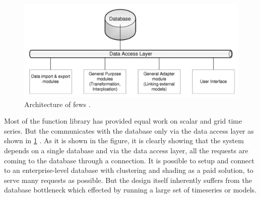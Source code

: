 \begin{figure}[htp]
    \centering
    \includegraphics[width=1.0\textwidth]{lit/fews/Architecture-of-Delft-FEWS-showing-the-data-base-the-data-access-layers-and-examples-of_W640.png}
    \caption[Architecture of \acrshort{fews}]{Architecture of \acrshort{fews} \cite{Werner2013TheSystem}.}
    \label{fi:fews_data_layer}
\end{figure}
Most of the function library has provided equal work on scalar and grid time series. But the communicates with the database only via the data access layer as shown in \cref{fi:fews_data_layer} \cite{Werner2013TheSystem}. As it is shown in the figure, it is clearly showing that the system depends on a single database and via the data access layer, all the requests are coming to the database through a connection. It is possible to setup and connect to an enterprise-level database with clustering and shading as a paid solution, to serve many requests as possible. But the design itself inherently suffers from the database bottleneck which effected by running a large set of timeseries or models.

